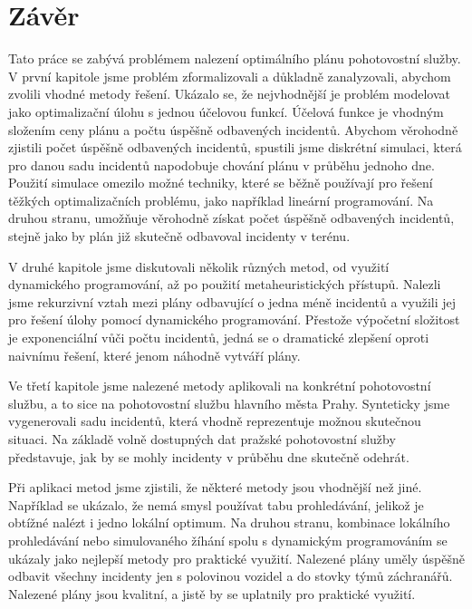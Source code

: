 \chapter*{Závěr}

Tato práce se zabývá problémem nalezení optimálního plánu pohotovostní služby. 
V první kapitole jsme problém zformalizovali a důkladně zanalyzovali, abychom zvolili vhodné metody řešení.
Ukázalo se, že nejvhodnější je problém modelovat jako optimalizační úlohu s jednou účelovou funkcí.
Účelová funkce je vhodným složením ceny plánu a počtu úspěšně odbavených incidentů.
Abychom věrohodně zjistili počet úspěšně odbavených incidentů, spustili jsme diskrétní simulaci, která pro danou sadu incidentů napodobuje chování plánu v průběhu jednoho dne.
Použití simulace omezilo možné techniky, které se běžně používají pro řešení těžkých optimalizačních problému, jako například lineární programování.
Na druhou stranu, umožňuje věrohodně získat počet úspěšně odbavených incidentů, stejně jako by plán již skutečně odbavoval incidenty v terénu.
 
V druhé kapitole jsme diskutovali několik různých metod, od využití dynamického programování, až po použití metaheuristických přístupů.
Nalezli jsme rekurzivní vztah mezi plány odbavující o jedna méně incidentů
a využili jej pro řešení úlohy pomocí dynamického programování. Přestože výpočetní složitost je exponenciální vůči počtu incidentů, 
jedná se o dramatické zlepšení oproti naivnímu řešení, které jenom náhodně vytváří plány.

Ve třetí kapitole jsme nalezené metody aplikovali na konkrétní pohotovostní službu, a to sice na pohotovostní službu hlavního města Prahy.
Synteticky jsme vygenerovali sadu incidentů, která vhodně reprezentuje možnou skutečnou situaci.
Na základě volně dostupných dat pražské pohotovostní služby představuje, jak by se mohly incidenty v průběhu dne skutečně odehrát.

Při aplikaci metod jsme zjistili, že některé metody jsou vhodnější než jiné. Například se ukázalo, že nemá smysl používat tabu prohledávání, jelikož je obtížné nalézt i jedno lokální optimum.
Na druhou stranu, kombinace lokálního prohledávání nebo simulovaného žíhání spolu s dynamickým programováním se ukázaly jako nejlepší metody pro praktické využití.
Nalezené plány uměly úspěšně odbavit všechny incidenty jen s polovinou vozidel a do stovky týmů záchranářů.
Nalezené plány jsou kvalitní, a jistě by se uplatnily pro praktické využití.


